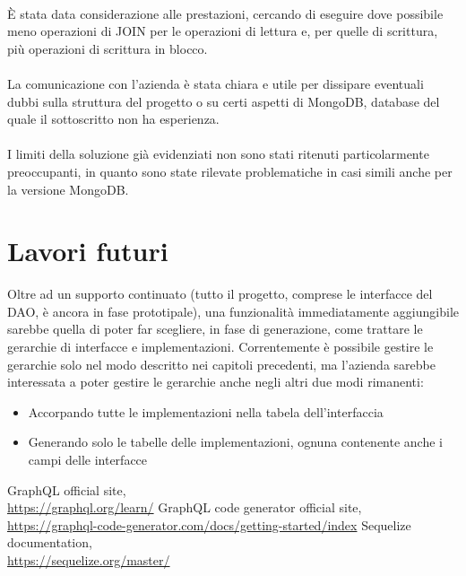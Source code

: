 \documentclass[a4paper, 12pt]{report}
\begin{document}
      \paragraph*{}
        È stata data considerazione alle prestazioni, cercando di eseguire dove possibile meno operazioni di JOIN per le operazioni di lettura e, per quelle di scrittura, più operazioni di scrittura in blocco.
      \paragraph*{}
        La comunicazione con l'azienda è stata chiara e utile per dissipare eventuali dubbi sulla struttura del progetto o su certi aspetti di MongoDB, database del quale il sottoscritto non ha esperienza.
      \paragraph*{}
        I limiti della soluzione già evidenziati non sono stati ritenuti particolarmente preoccupanti, in quanto sono state rilevate problematiche in casi simili anche per la versione MongoDB.
      \section*{Lavori futuri}
        Oltre ad un supporto continuato (tutto il progetto, comprese le interfacce del DAO, è ancora in fase prototipale), una funzionalità immediatamente aggiungibile sarebbe quella di poter far scegliere, in fase di generazione, come trattare le gerarchie di interfacce e implementazioni.
        Correntemente è possibile gestire le gerarchie solo nel modo descritto nei capitoli precedenti, ma l'azienda sarebbe interessata a poter gestire le gerarchie anche negli altri due modi rimanenti:
        \begin{itemize}
          \item Accorpando tutte le implementazioni nella tabela dell'interfaccia
          \item Generando solo le tabelle delle implementazioni, ognuna contenente anche i campi delle interfacce
        \end{itemize}
    \newpage
    \begin{thebibliography}{3}
      GraphQL official site,\\\href{https://graphql.org/learn/}{https://graphql.org/learn/}
      GraphQL code generator official site,\\\href{https://graphql-code-generator.com/docs/getting-started/index}{https://graphql-code-generator.com/docs/getting-started/index}
      Sequelize documentation,\\\href{https://sequelize.org/master/}{https://sequelize.org/master/}
    \end{thebibliography}
\end{document}
